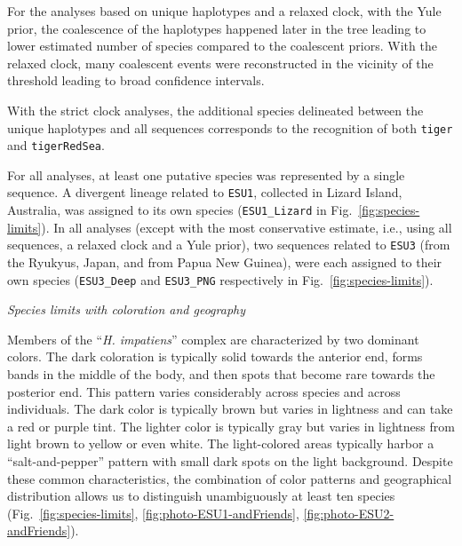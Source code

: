 \documentclass[12pt,letterpaper]{article}\usepackage[]{graphicx}\usepackage[]{color}
\renewcommand{\subsection}[1]{%
\bigskip
\begin{center}
\begin{large}
\normalfont\itshape #1
\end{large}
\end{center}}
\begin{document}
For the analyses based on unique haplotypes and a relaxed clock, with the Yule
prior, the coalescence of the haplotypes happened later in the tree leading to
lower estimated number of species compared to the coalescent priors. With the
relaxed clock, many coalescent events were reconstructed in the vicinity of the
threshold leading to broad confidence intervals.

With the strict clock analyses, the additional species delineated between the
unique haplotypes and all sequences corresponds to the recognition of both
\texttt{tiger} and \texttt{tigerRedSea}.

For all analyses, at least one putative species was represented by a single
sequence. A divergent lineage related to \texttt{ESU1}, collected in Lizard
Island, Australia, was assigned to its own species (\texttt{ESU1\_Lizard} in
Fig.~\ref{fig:species-limits}). In all analyses (except with the most
conservative estimate, i.e., using all sequences, a relaxed clock and a Yule
prior), two sequences related to \texttt{ESU3} (from the Ryukyus, Japan, and
from Papua New Guinea), were each assigned to their own species
(\texttt{ESU3\_Deep} and \texttt{ESU3\_PNG} respectively in
Fig.~\ref{fig:species-limits}).

\subsection{Species limits with coloration and geography}

Members of the ``\textit{H. impatiens}'' complex are characterized by two
dominant colors. The dark coloration is typically solid towards the anterior
end, forms bands in the middle of the body, and then spots that become rare
towards the posterior end.  This pattern varies considerably across species and
across individuals. The dark color is typically brown but varies in lightness
and can take a red or purple tint. The lighter color is typically gray but
varies in lightness from light brown to yellow or even white. The light-colored
areas typically harbor a ``salt-and-pepper'' pattern with small dark spots on
the light background. Despite these common characteristics, the combination of
color patterns and geographical distribution allows us to distinguish
unambiguously at least ten species (Fig.~\ref{fig:species-limits},
\ref{fig:photo-ESU1-andFriends}, \ref{fig:photo-ESU2-andFriends}).
\end{document}

